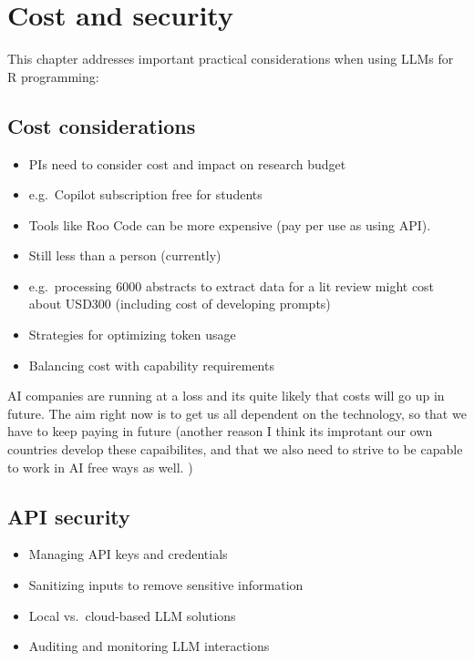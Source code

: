 \documentclass[
  letterpaper,
  DIV=11,
  numbers=noendperiod]{scrreprt}
\providecommand{\tightlist}{%
  \setlength{\itemsep}{0pt}\setlength{\parskip}{0pt}}\usepackage{longtable,booktabs,array}
\begin{document}

\chapter{Cost and security}\label{cost-and-security}

This chapter addresses important practical considerations when using
LLMs for R programming:

\section{Cost considerations}\label{cost-considerations}

\begin{itemize}
\tightlist
\item
  PIs need to consider cost and impact on research budget
\item
  e.g.~Copilot subscription free for students
\item
  Tools like Roo Code can be more expensive (pay per use as using API).
\item
  Still less than a person (currently)
\item
  e.g.~processing 6000 abstracts to extract data for a lit review might
  cost about USD300 (including cost of developing prompts)
\item
  Strategies for optimizing token usage
\item
  Balancing cost with capability requirements
\end{itemize}

AI companies are running at a loss and its quite likely that costs will
go up in future. The aim right now is to get us all dependent on the
technology, so that we have to keep paying in future (another reason I
think its improtant our own countries develop these capaibilites, and
that we also need to strive to be capable to work in AI free ways as
well. )

\section{API security}\label{api-security}

\begin{itemize}
\tightlist
\item
  Managing API keys and credentials
\item
  Sanitizing inputs to remove sensitive information
\item
  Local vs.~cloud-based LLM solutions
\item
  Auditing and monitoring LLM interactions
\end{itemize}
\end{document}
